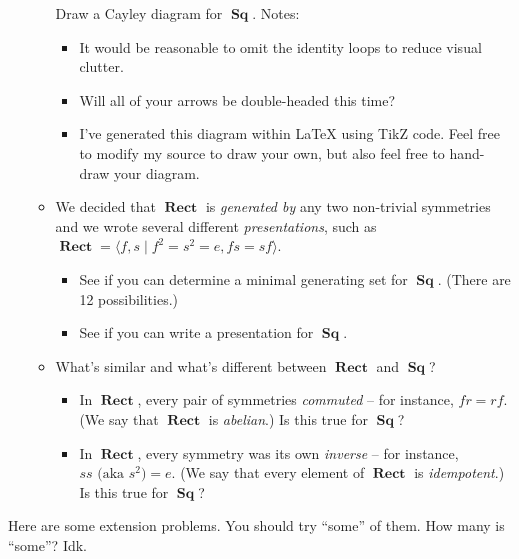 \documentclass[12pt]{article}
\DeclareMathOperator\Rect{\mathbf{Rect}}
\DeclareMathOperator\Sq{\mathbf{Sq}}
\begin{document}
\begin{enumerate}
\begin{itemize}
    Draw a Cayley diagram for $\Sq$. Notes:
    \begin{itemize}
        \item It would be reasonable to omit the identity loops to reduce visual clutter.
        \item Will all of your arrows be double-headed this time?
        \item I've generated this diagram within LaTeX using TikZ code. Feel free to modify my source to draw your own, but also feel free to hand-draw your diagram.
    \end{itemize}

    \item We decided that $\Rect$ is \textit{generated by} any two non-trivial symmetries and we wrote several different \textit{presentations}, such as $\Rect = \langle f, s \mid f^2 = s^2 = e, fs = sf \rangle$. 
    \begin{itemize}
        \item See if you can determine a minimal generating set for $\Sq$. (There are 12 possibilities.)
        \item See if you can write a presentation for $\Sq$.
    \end{itemize} 

    \item What's similar and what's different between $\Rect$ and $\Sq$?
    \begin{itemize}
        \item In $\Rect$, every pair of symmetries \textit{commuted} -- for instance, $fr = rf$. (We say that $\Rect$ is \textit{abelian}.) Is this true for $\Sq$?
        \item In $\Rect$, every symmetry was its own \textit{inverse} -- for instance, $ss \text{ (aka } s^2) = e$. (We say that every element of $\Rect$ is \textit{idempotent}.) Is this true for $\Sq$?
    \end{itemize}

    \end{itemize}
\end{enumerate}

Here are some extension problems. You should try ``some'' of them. How many is ``some''? Idk.
\end{document}
